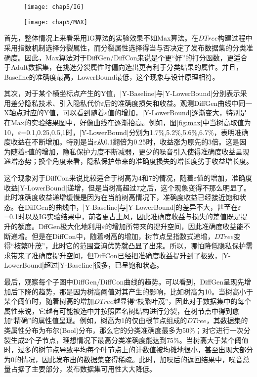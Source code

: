 \begin{figure}[!htp]
	\centering
	\texttt{[image: chap5/IG]}
\end{figure}

\begin{figure}[!htp]
	\centering
	\texttt{[image: chap5/MAX]}
\end{figure}

首先，整体情况上来看采用IG算法的实验效果不如Max算法。在$DTree$构建过程中采用指数机制选择分裂属性，而分裂属性选择得当与否决定了发布数据集的分类准确度。因此，Max算法对于DiffGen/DiffCon来说是个更“好”的打分函数，更适合于Adult数据集，在挑选分裂属性时偏向选出更有利于分类结果的属性。并且，Baseline的准确度最高，LowerBound最低，这个现象与设计原理相符。

其次，对于某个横坐标点产生的Y值，|Y-Baseline|与|Y-LowerBound|分别表示采用差分隐私技术、引入隐私代价$\varepsilon$后的准确度损失和收益。观测DiffGen曲线中同一X轴点对应的Y值，可以看到随着$\varepsilon$值的增加，|Y-LowerBound|逐渐变大，特别是在Max的实验结果图中，好像曲线在逐渐抬高。例如，图\ref{fig:max}中当树高取值为10，$\varepsilon$=0.1,0.25,0.5,1时，|Y-LowerBound|分别为1.7\%,5.2\%,5.6\%,6.7\%，表明准确度收益在不断增加。特别是当$\varepsilon$从0.1翻倍为0.25时，收益涨为原先的3倍。这是因为随着$\varepsilon$值的增加，隐私保护力度不断减弱，更少的噪音引入使得准确度收益呈现递增态势；换个角度来看，隐私保护带来的准确度损失的增长度劣于收益增长度。

这个现象对于DiffCon来说比较适合于树高为4和7的情况，随着$\varepsilon$值的增加，准确度收益|Y-LowerBound|递增，但是当树高超过7之后，这个现象变得不那么明显了。此时准确度收益递增缓慢是因为在当前树高情况下，准确度收益已经接近饱和状态。在DiffGen的曲线中，|Y-Baseline|与|Y-LowerBound|的差异不大，甚至在$\varepsilon$=0.1时以及IG实验结果中，前者更占上风，因此准确度收益与损失的差值既是提升的额度。DffGen极大化地利用$\varepsilon$的增加所带来的提升空间，因此准确度收益能不断递增。但是在DiffCon中，随着树高的增加，树节点呈指数式递增，$DTree$变得“枝繁叶茂”，此时它的范围查询优势就凸显了出来。所以，哪怕降低隐私保护需求带来了准确度提升空间，但DiffCon已经把准确度收益提升到了极致，|Y-LowerBound|超过|Y-Baseline|很多，已呈饱和状态。

最后，观察每个子图中DiffGen/DiffCon曲线的趋势。可以看到，DiffGen呈现先增加后下降的趋势，那是因为树高阈值对其产生的影响，比如树高为10。当树高小于某个阈值时，随着树高的增加$DTree$越显得“枝繁叶茂”，因此对于数据集中的每个属性来说，它越有可能被选中并按照匿名树结构进行分裂，在树节点中得到愈加“精确”的属性值呈现。例如，树高为1的仅由根节点组成的$DTree$，其数据集的类属性分布为布尔(Bool)分布，那么它的分类准确度最多为50\%；对它进行一次分裂生成2个子节点，理想情况下最高分类准确度能达到75\%。当树高大于某个阈值时，过多的树节点导致平均每个叶节点上的计数值被均摊地很小，甚至出现大部分为0的情况，因此发布出的数据集变得稀疏\cite{sparse_data_summary}。此时，加噪后的返回结果中，噪音总量占据了主要部分，发布数据集可用性大大降低。

